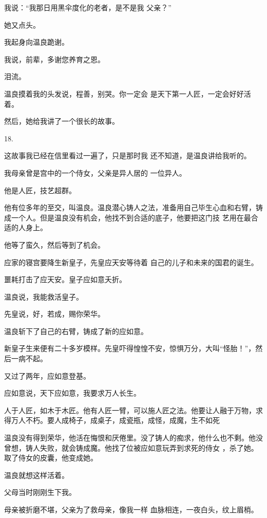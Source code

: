 \documentclass{article}
\begin{document}
\newpage

我说：“我那日用黑伞度化的老者，是不是我
父亲？” 


她又点头。 


我起身向温良跪谢。 


我说，前辈，多谢您养育之恩。 


泪流。 

温良摸着我的头发说，程善，别哭。你一定会
是天下第一人匠，一定会好好活着。 


然后，她给我讲了一个很长的故事。 


18. 

这故事我已经在信里看过一遍了，只是那时我
还不知道，是温良讲给我听的。 

\newpage

我母亲曾是宫中的一个侍女，父亲是异人居的
一位异人。 


他是人匠，技艺超群。 

他有位多年的至交，叫温良。温良潜心铸人之法，准备用自己毕生心血和右臂，铸成一个人。但是温良没有机会，他找不到合适的底子，他要把这门技
艺用在最合适的人身上。 


他等了蛮久，然后等到了机会。 

应家的寝宫要降生新皇子，先皇应天安等待着
自己的儿子和未来的国君的诞生。 


噩耗打击了应天安。皇子应如意夭折。 


温良说，我能救活皇子。 


先皇说，好，若成，赐你荣华。 

\newpage

温良斩下了自己的右臂，铸成了新的应如意。

新皇子生来便有二十多岁模样。先皇吓得惶惶不安，惊惧万分，大叫“怪胎！”，然后一病不起。


又过了两年，应如意登基。 


应如意说，天下应如意，我要求万人长生。 

人于人匠，如木于木匠。他有人匠一臂，可以施人匠之法。他要让人融于万物，求得万人不朽。要人成椅子，成桌子，成瓷瓶，成怪，成魔，生不如死

温良没有得到荣华，他活在悔恨和厌倦里。没了铸人的痴求，他什么也不剩。他没曾想，铸人失败，就会铸成魔。他找了位被应如意玩弄到求死的侍女
，杀了她。取了侍女的皮囊，他变成她。 


温良就想这样活着。 


\newpage

父母当时刚刚生下我。 

母亲被折磨不堪，父亲为了救母亲，像我一样
血脉相连，一夜白头，纹上眉梢。 
\end{document}
